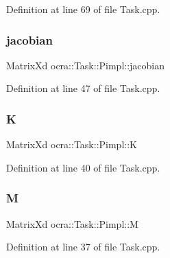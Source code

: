 Definition at line 69 of file Task.\+cpp.

\hypertarget{structocra_1_1Task_1_1Pimpl_a79b15db6e75e0e793aa3fd0af5314f41}{}\label{structocra_1_1Task_1_1Pimpl_a79b15db6e75e0e793aa3fd0af5314f41} 
\subsubsection{\texorpdfstring{jacobian}{jacobian}}
{\footnotesize\ttfamily Matrix\+Xd ocra\+::\+Task\+::\+Pimpl\+::jacobian}



Definition at line 47 of file Task.\+cpp.

\hypertarget{structocra_1_1Task_1_1Pimpl_afc46e9f96d5c7123e7b086ea05144925}{}\label{structocra_1_1Task_1_1Pimpl_afc46e9f96d5c7123e7b086ea05144925} 
\subsubsection{\texorpdfstring{K}{K}}
{\footnotesize\ttfamily Matrix\+Xd ocra\+::\+Task\+::\+Pimpl\+::K}



Definition at line 40 of file Task.\+cpp.

\hypertarget{structocra_1_1Task_1_1Pimpl_af7188c1ce99312015c8638699bd5754f}{}\label{structocra_1_1Task_1_1Pimpl_af7188c1ce99312015c8638699bd5754f} 
\subsubsection{\texorpdfstring{M}{M}}
{\footnotesize\ttfamily Matrix\+Xd ocra\+::\+Task\+::\+Pimpl\+::M}



Definition at line 37 of file Task.\+cpp.

\hypertarget{structocra_1_1Task_1_1Pimpl_ac90e5b26fe9913da7926db938a8163fc}{}\label{structocra_1_1Task_1_1Pimpl_ac90e5b26fe9913da7926db938a8163fc} 
